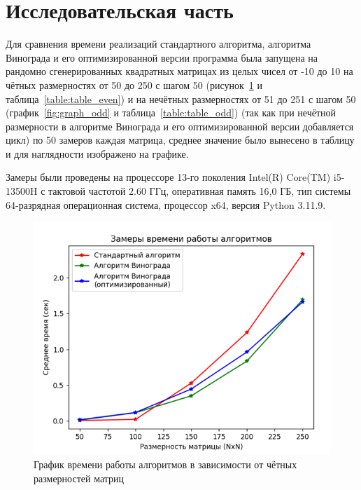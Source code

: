 \section{Исследовательская часть}

\hspace{1.25cm}
Для сравнения времени реализаций стандартного алгоритма, алгоритма Винограда и его оптимизированной версии программа была запущена на рандомно сгенерированных квадратных матрицах из целых чисел от -10 до 10 на чётных размерностях от 50 до 250 с шагом 50 (рисунок~\ref{fig:graph_even} и таблица~\ref{table:table_even}) и на нечётных размерностях от 51 до 251 с шагом 50 (график~\ref{fig:graph_odd} и таблица~\ref{table:table_odd}) (так как при нечётной размерности в алгоритме Винограда и его оптимизированной версии добавляется цикл) по 50 замеров каждая матрица, среднее значение было вынесено в таблицу и для наглядности изображено на графике.

Замеры были проведены на процессоре 13-го поколения Intel(R) Core(TM) i5-13500H с тактовой частотой 2.60 ГГц, оперативная память 16,0 ГБ,
тип системы	64-разрядная операционная система, процессор x64, версия Python 3.11.9.

\begin{figure}[H]
    \centering
    \includegraphics[width=1\textwidth]{img/graph_even.png}
    \caption{График времени работы алгоритмов в зависимости от чётных размерностей матриц}
    \label{fig:graph_even} %
\end{figure}


